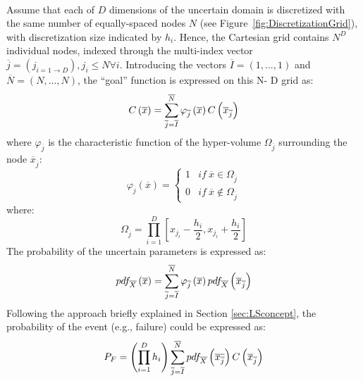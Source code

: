 \\Assume that each of $D$ dimensions of the uncertain domain is
discretized with the same number of equally-spaced nodes $N$ (see
Figure~\ref{fig:DiscretizationGrid}), with discretization size indicated
by $h_{i}$. Hence, the Cartesian grid contains $N^{D}$ individual
nodes, indexed through the multi-index vector $\overline{j} = \left (
j_{i=1\rightarrow D} \right ), j_{i} \leq N \forall i$. Introducing the
vectors  $\overline{I} = (1, ..., 1)$ and
$\overline{N} = (N, ..., N)$, the ``goal'' function is expressed on this N-
D grid as:
\begin{equation}
C\left ( \overline{x} \right ) =
\sum_{\overline{j}=\overline{I}}^{\overline{N}} \varphi_{\overline{j}}\left
( \overline{x} \right ) C\left ( \overline{x}_{\overline{j}} \right )
\end{equation}
where $\varphi_{\overline{j}}$ is the characteristic function of the hyper-volume $\Omega_{\overline{j}}$ surrounding the node
 $\overline{x}_{\overline{j}}$:
 \begin{equation}
 \varphi_{\overline{j}}\left ( \overline{x} \right ) =
\left\{\begin{matrix}
1 & if \: \overline{x} \in \Omega_{\overline{j}} \\
0 & if \: \overline{x} \notin \Omega_{\overline{j}}
\end{matrix}\right.
\end{equation}
where:
 \begin{equation}
 \label{eq:OmegaEq}
 \Omega_{\overline{j}} = \prod_{i=1}^{D}\left [ x_{j_{i}} - \frac{h_{i}}{2},
 x_{j_{i}} + \frac{h_{i}}{2}  \right ]
 \end{equation}
 The probability of the uncertain parameters is expressed as:
 \begin{equation}
 pdf_{\overline{X}}\left ( \overline{x} \right ) =
\sum_{\overline{j}=\overline{I}}^{\overline{N}}
\varphi_{\overline{j}}\left ( \overline{x} \right )
pdf_{\overline{X}}\left ( \overline{x}_{\overline{j}} \right )
 \end{equation}
Following the approach briefly explained in Section
\ref{sec:LSconcept}, the probability of the event (e.g., failure) could be
expressed as:
 \begin{equation}
 \label{eq:Pf}
  P_{F}=\left ( \prod_{i=1}^{D}h_{i} \right )
  \sum_{\overline{j}=
  \overline{I}}^{\overline{N}}pdf_{\overline{X}}\left (
  \overline{x_{\overline{j}}} \right )
  C\left ( \overline{x}_{\overline{j}} \right )
 \end{equation}
